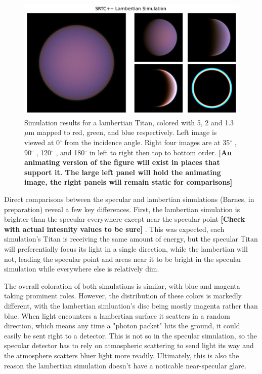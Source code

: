 \documentclass[twocolumn,linenumbers]{aastex631}
\begin{document}
\begin{figure}[htbp]
\includegraphics[scale = 0.4]{LambertianSim.pdf}
\centering
\caption{Simulation results for a lambertian Titan, colored with 5, 2 and 1.3 $\mu$m mapped to red, green, and blue respectively. Left image is viewed at 0$^{\circ}$  from the incidence angle. Right four images are at  35$^{\circ}$ ,  90$^{\circ}$ ,  120$^{\circ}$ , and  180$^{\circ}$  in left to right then top to bottom order. \textbf{\color{red}[An animating version of the figure will exist in places that support it. The large left panel will hold the animating image, the right panels will remain static for comparisons] \color{black}}}
\label{fig:9}
\end{figure}

Direct comparisons between the specular and lambertian simulations (Barnes, in preparation) reveal a few key differences. First, the lambertian simulation is brighter than the specular everywhere except near the specular point \textbf{\color{red} [Check with actual intesnity values to be sure] \color{black}}. This was expected, each simulation's Titan is receiving the same amount of energy, but the specular Titan will preferentially focus its light in a single direction, while the lambertian will not, leading the specular point and areas near it to be bright in the specular simulation while everywhere else is relatively dim. 

The overall coloration of both simulations is similar, with blue and magenta taking prominent roles. However, the distribution of these colors is markedly different, with the lambertian simluation's disc being mostly magenta rather than blue. When light encounters a lambertian surface it scatters in a random direction, which means any time a "photon packet" hits the ground, it could easily be sent right to a detector. This is not so in the specular simulation, so the specular detector has to rely on atmospheric scattering to send light its way and the atmosphere scatters bluer light more readily. Ultimately, this is also the reason the lambertian simulation doesn't have a noticable near-specular glare.
\end{document}
